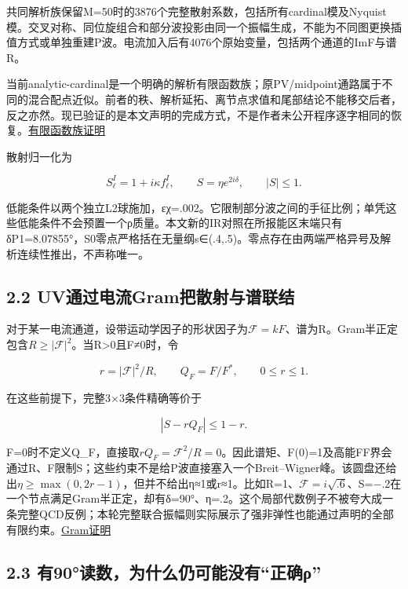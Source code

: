 \documentclass[
  10pt,
  a4paper,
]{article}
\begin{document}
共同解析族保留M=50时的3876个完整散射系数，包括所有cardinal模及Nyquist模。交叉对称、同位旋组合和部分波投影由同一个振幅生成，不能为不同图更换插值方式或单独重建P波。电流加入后有4076个原始变量，包括两个通道的ImF与谱R。

当前analytic-cardinal是一个明确的解析有限函数族；原PV/midpoint通路属于不同的混合配点近似。前者的秩、解析延拓、离节点求值和尾部结论不能移交后者，反之亦然。现已验证的是本文声明的完成方式，不是作者未公开程序逐字相同的恢复。\href{../../../evidence/ANALYTIC_CARDINAL_FINITE_PROOFS_20260911.md}{有限函数族证明}

散射归一化为

\[S_\ell^I=1+i\kappa f_\ell^I,\qquad S=\eta e^{2i\delta},\qquad |S|\le1.\]

低能条件以两个独立L2球施加，εχ=.002。它限制部分波之间的手征比例；单凭这些低能条件不会预置一个ρ质量。本文新的IR对照在所报能区末端只有δP1=8.07855°，S0零点严格括在无量纲s∈(.4,.5)。零点存在由两端严格异号及解析连续性推出，不声称唯一。

\subsection{2.2
UV通过电流Gram把散射与谱联结}\label{uvux901aux8fc7ux7535ux6d41gramux628aux6563ux5c04ux4e0eux8c31ux8054ux7ed3}

对于某一电流通道，设带运动学因子的形状因子为\(\mathcal F=kF\)、谱为R。Gram半正定包含\(R\ge|\mathcal F|^2\)。当R\textgreater0且F≠0时，令

\[r=|\mathcal F|^2/R,\qquad Q_F=F/F^*,\qquad 0\le r\le1.\]

在这些前提下，完整3×3条件精确等价于

\[|S-rQ_F|\le1-r.\]

F=0时不定义Q\_F，直接取\(rQ_F=\mathcal F^2/R=0\)。因此谱矩、F(0)=1及高能FF界会通过R、F限制S；这些约束不是给P波直接塞入一个Breit--Wigner峰。该圆盘还给出\(\eta\ge\max(0,2r-1)\)，但并不给出η≈1或r≈1。比如R=1、\(\mathcal F=i\sqrt{.6}\)、S=−.2在一个节点满足Gram半正定，却有δ=90°、η=.2。这个局部代数例子不被夸大成一条完整QCD反例；本轮完整联合振幅则实际展示了强非弹性也能通过声明的全部有限约束。\href{../../../evidence/GRAM_DISK_AND_INELASTICITY_20260911.md}{Gram证明}

\subsection{2.3
有90°读数，为什么仍可能没有``正确ρ''}\label{ux670990ux8bfbux6570ux4e3aux4ec0ux4e48ux4ecdux53efux80fdux6ca1ux6709ux6b63ux786eux3c1}
\end{document}
